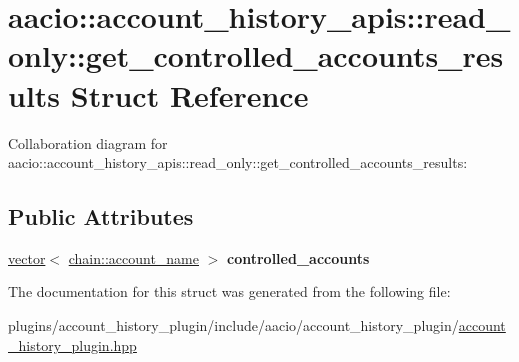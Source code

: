 \hypertarget{structaacio_1_1account__history__apis_1_1read__only_1_1get__controlled__accounts__results}{}\section{aacio\+:\+:account\+\_\+history\+\_\+apis\+:\+:read\+\_\+only\+:\+:get\+\_\+controlled\+\_\+accounts\+\_\+results Struct Reference}
\label{structaacio_1_1account__history__apis_1_1read__only_1_1get__controlled__accounts__results}


Collaboration diagram for aacio\+:\+:account\+\_\+history\+\_\+apis\+:\+:read\+\_\+only\+:\+:get\+\_\+controlled\+\_\+accounts\+\_\+results\+:
\subsection*{Public Attributes}
\begin{DoxyCompactItemize}
\item 
\mbox{\label{structaacio_1_1account__history__apis_1_1read__only_1_1get__controlled__accounts__results_af23471d0ee9607e97a57c0a7abb09d49}} 
\mbox{\hyperlink{classstd_1_1vector}{vector}}$<$ \mbox{\hyperlink{structaacio_1_1chain_1_1name}{chain\+::account\+\_\+name}} $>$ {\bfseries controlled\+\_\+accounts}
\end{DoxyCompactItemize}


The documentation for this struct was generated from the following file\+:\begin{DoxyCompactItemize}
\item 
plugins/account\+\_\+history\+\_\+plugin/include/aacio/account\+\_\+history\+\_\+plugin/\mbox{\hyperlink{account__history__plugin_8hpp}{account\+\_\+history\+\_\+plugin.\+hpp}}\end{DoxyCompactItemize}

